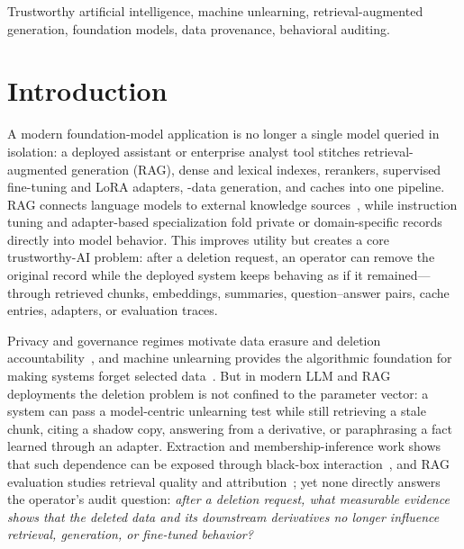 \documentclass[10pt,journal,compsoc]{IEEEtran}
\begin{document}
\begin{IEEEkeywords}
Trustworthy artificial intelligence, machine unlearning, retrieval-augmented generation, foundation models, data provenance, behavioral auditing.
\end{IEEEkeywords}



\section{Introduction}

A modern foundation-model application is no longer a single model queried in isolation: a deployed assistant or enterprise analyst tool stitches retrieval-augmented generation (RAG), dense and lexical indexes, rerankers, supervised fine-tuning and LoRA adapters, -data generation, and caches into one pipeline. RAG connects language models to external knowledge sources~\cite{lewis2020rag,karpukhin2020dpr,izacard2021fid}, while instruction tuning and adapter-based specialization fold private or domain-specific records directly into model behavior. This improves utility but creates a core trustworthy-AI problem: after a deletion request, an operator can remove the original record while the deployed system keeps behaving as if it remained---through retrieved chunks, embeddings, summaries, question--answer pairs, cache entries, adapters, or evaluation traces.

Privacy and governance regimes motivate data erasure and deletion accountability~\cite{voigt2017gdpr,fan2025fedfmchallenges}, and machine unlearning provides the algorithmic foundation for making systems forget selected data~\cite{cao2015machineunlearning,ginart2019making,bourtoule2021machineunlearning,guo2020certified,yao2024largeunlearning,liu2024rethinking,jin2024surveyunlearning}. But in modern LLM and RAG deployments the deletion problem is not confined to the parameter vector: a system can pass a model-centric unlearning test while still retrieving a stale chunk, citing a shadow copy, answering from a derivative, or paraphrasing a fact learned through an adapter. Extraction and membership-inference work shows that such dependence can be exposed through black-box interaction~\cite{carlini2019secretsharer,carlini2021extracting,carlini2023quantifying,shokri2017membership,yeom2018privacy,mattern2023membership}, and RAG evaluation studies retrieval quality and attribution~\cite{asai2024selfrag}; yet none directly answers the operator's audit question: \textit{after a deletion request, what measurable evidence shows that the deleted data and its downstream derivatives no longer influence retrieval, generation, or fine-tuned behavior?}
\end{document}
